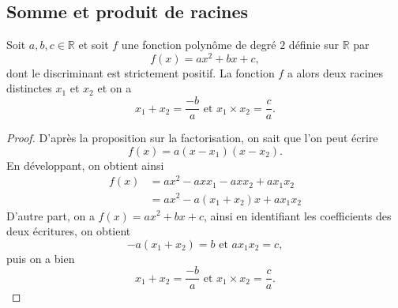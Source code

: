 \documentclass[11pt]{article}
\begin{document}
\subsection{Somme et produit de racines}
\begin{prop}
  Soit $a,b,c\in\mathbb{R}$ et soit $f$ une fonction polynôme de degré $2$
  définie sur $\mathbb{R}$ par
  \[
    f(x)=ax^2+bx+c,
  \]
  dont le discriminant est strictement positif. La fonction $f$ a alors deux
  racines distinctes $x_1$ et $x_2$ et on a
  \[
    x_1+x_2 = \frac{-b}{a}\text{ et }x_1\times x_2=\frac{c}{a}.
  \]
\end{prop}
\begin{proof}
  D'après la proposition sur la factorisation, on sait que l'on peut écrire
  \[
    f(x) = a(x-x_1)(x-x_2).
  \]
  En développant, on obtient ainsi
  \begin{align*}
    f(x) &= ax^2 - axx_1 - axx_2+ax_1x_2 \\
    &= ax^2 - a(x_1+x_2)x + ax_1x_2
  \end{align*}
  D'autre part, on a $f(x) = ax^2+bx+c$, ainsi en identifiant les coefficients
  des deux écritures, on obtient
  \[
    -a(x_1+x_2) = b\text{ et }ax_1x_2=c,
  \]
  puis on a bien
  \[
    x_1+x_2 = \frac{-b}{a}\text{ et }x_1\times x_2=\frac{c}{a}.
  \]
\end{proof}
\end{document}
